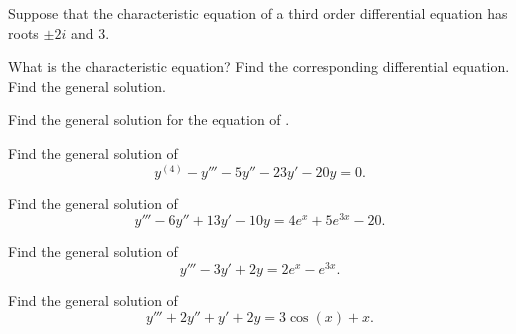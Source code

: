 \documentclass{ximera}
\begin{document}
\begin{exercise}
    Suppose that the characteristic equation of a third order differential equation has roots $\pm 2i$ and 3.
    \begin{tasks}
        \task What is the characteristic equation?
        \task Find the corresponding differential equation.
        \task Find the general solution.
    \end{tasks}
\end{exercise}

\begin{exercise}
    Find the general solution for the equation of .
\end{exercise}

\begin{exercise}%
    Find the general solution of
    \begin{equation*}
        y^{(4)} - y''' - 5y'' - 23y' - 20y = 0.
    \end{equation*}
\end{exercise}

\begin{exercise}
    Find the general solution of
    \begin{equation*}
        y''' - 6y'' + 13y' - 10y = 4e^x + 5e^{3x} - 20.
    \end{equation*}
\end{exercise}


\begin{exercise}
    Find the general solution of
    \begin{equation*}
        y''' - 3y' + 2y = 2e^{x} - e^{3x}.
    \end{equation*}
\end{exercise}


\begin{exercise}
    Find the general solution of
    \begin{equation*}
        y''' + 2y'' + y' + 2y = 3\cos(x) + x.
    \end{equation*}
\end{exercise}
\end{document}
